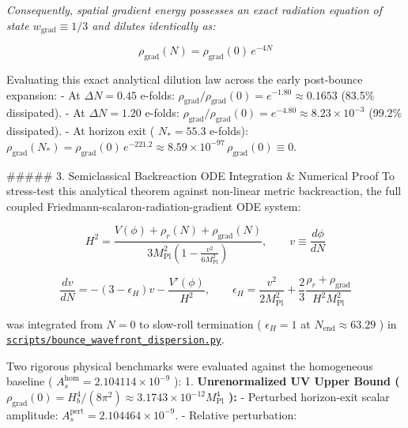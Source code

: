 \documentclass[11pt,a4paper]{article}
\theoremstyle{definition}
\theoremstyle{remark}
\begin{document}
\textit{Consequently, spatial gradient energy possesses an exact radiation equation of state $w_{\text{grad}} \equiv 1/3$ and dilutes identically as:}


\begin{equation}
\boxed{\rho_{\text{grad}}(N) = \rho_{\text{grad}}(0) \, e^{-4N}}
\end{equation}


Evaluating this exact analytical dilution law across the early post-bounce expansion:
- At $\Delta N = 0.45$ e-folds: $\rho_{\text{grad}} / \rho_{\text{grad}}(0) = e^{-1.80} \approx 0.1653$ (83.5\% dissipated).
- At $\Delta N = 1.20$ e-folds: $\rho_{\text{grad}} / \rho_{\text{grad}}(0) = e^{-4.80} \approx 8.23 \times 10^{-3}$ (99.2\% dissipated).
- At horizon exit ( $N_* = 55.3$ e-folds): $\rho_{\text{grad}}(N_*) = \rho_{\text{grad}}(0) \, e^{-221.2} \approx 8.59 \times 10^{-97} \, \rho_{\text{grad}}(0) \equiv 0$.

\#\#\#\#\# 3. Semiclassical Backreaction ODE Integration \& Numerical Proof
To stress-test this analytical theorem against non-linear metric backreaction, the full coupled Friedmann-scalaron-radiation-gradient ODE system:


\begin{equation}
H^2 = \frac{V(\phi) + \rho_r(N) + \rho_{\text{grad}}(N)}{3 M_{\text{Pl}}^2 \left(1 - \frac{v^2}{6 M_{\text{Pl}}^2}\right)}, \qquad v \equiv \frac{d\phi}{dN}
\end{equation}



\begin{equation}
\frac{dv}{dN} = -(3 - \epsilon_H) v - \frac{V'(\phi)}{H^2}, \qquad \epsilon_H = \frac{v^2}{2 M_{\text{Pl}}^2} + \frac{2}{3} \frac{\rho_r + \rho_{\text{grad}}}{H^2 M_{\text{Pl}}^2}
\end{equation}


was integrated from $N = 0$ to slow-roll termination ( $\epsilon_H = 1$ at $N_{\text{end}} \approx 63.29$ ) in \href{../../scripts/bounce_wavefront_dispersion.py}{\texttt{scripts/bounce_wavefront_dispersion.py}}.

Two rigorous physical benchmarks were evaluated against the homogeneous baseline ( $A_s^{\text{hom}} = 2.104114 \times 10^{-9}$ ):
1. \textbf{Unrenormalized UV Upper Bound ( $\rho_{\text{grad}}(0) = H_b^4 / (8\pi^2) \approx 3.1743 \times 10^{-12} M_{\text{Pl}}^4$ ):}
- Perturbed horizon-exit scalar amplitude: $A_s^{\text{pert}} = 2.104464 \times 10^{-9}$.
- Relative perturbation:
\end{document}
